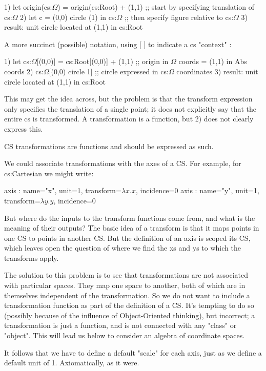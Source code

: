 \documentclass[12pt]{tufte-handout}
\numberwithin{equation}{subsection}
\numberwithin{equation}{subsection}
\begin{document}
  1)	  let origin(cs:$\Omega$) = origin(cs:Root) + (1,1)  ;; start by specifying translation of cs:$\Omega$
  2)	  let c = (0,0) circle (1) in cs:$\Omega$  ;; then specify figure relative to cs:$\Omega$
  3)	  result: unit circle located at (1,1) in cs:Root

  A more succinct (possible) notation, using [ ] to indicate a cs "context" :

  1)	  let cs:$\Omega$[(0,0)] = cs:Root[(0,0)] + (1,1)  ;; origin in $\Omega$ coords = (1,1) in Abs coords
  2)	  cs:$\Omega$[(0,0) circle 1]   ;; circle expressed in cs:$\Omega$ coordinates
  3)	  result: unit circle located at (1,1) in cs:Root

  This may get the idea across, but the problem is that the transform
  expression only specifies the translation of a single point; it does
  not explicitly say that the entire cs is transformed.  A
  transformation is a function, but 2) does not clearly express this.

  CS transformations are functions and should be expressed as such.

  We could associate transformations with the axes of a CS.  For
  example, for cs:Cartesian we might write:

  axis : {name="x", unit=1, transform=\(\lambda x.x\), incidence=0}
  axis : {name="y", unit=1, transform=\(\lambda y.y\), incidence=0}

  But where do the inputs to the transform functions come from, and what
  is the meaning of their outputs?  The basic idea of a transform is
  that it maps points in one CS to points in another CS.  But the
  definition of an axis is scoped its CS, which leaves open the question
  of where we find the xs and ys to which the transforms apply.

  The solution to this problem is to see that transformations are not
  associated with particular spaces.  They map one space to another,
  both of which are in themselves independent of the transformation.  So
  we do not want to include a transformation function as part of the
  definition of a CS.  It's tempting to do so (possibly because of the
  influence of Object-Oriented thinking), but incorrect; a
  transformation is just a function, and is not connected with any
  "class" or "object".  This will lead us below to consider an algebra
  of coordinate spaces.

  It follows that we have to define a default "scale" for each axis,
  just as we define a default unit of 1.  Axiomatically, as it were.
\end{document}
